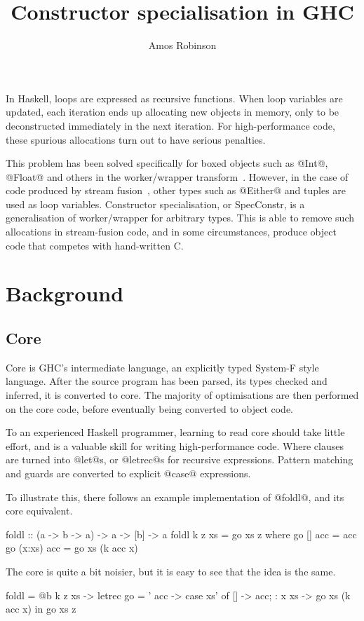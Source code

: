 \documentclass{tmr}
\title{Constructor specialisation in GHC}
\author{Amos Robinson\email{amosr@cse.unsw.edu.au}}
\begin{document}
\makeatactive

\begin{introduction}
In Haskell, loops are expressed as recursive functions. 
When loop variables are updated, each iteration ends up allocating new objects in memory, only to be deconstructed immediately in the next iteration.
For high-performance code, these spurious allocations turn out to have serious penalties.

This problem has been solved specifically for boxed objects such as @Int@, @Float@ and others in the worker/wrapper transform~\CITE.
However, in the case of code produced by stream fusion~\CITE, other types such as @Either@ and tuples are used as loop variables.
Constructor specialisation, or SpecConstr, is a generalisation of worker/wrapper for arbitrary types.
This is able to remove such allocations in stream-fusion code, and in some circumstances, produce object code that competes with hand-written C.
\end{introduction}

\section{Background}
\subsection{Core}
Core is GHC's intermediate language, an explicitly typed System-F style language.
After the source program has been parsed, its types checked and inferred, it is converted to core.
The majority of optimisations are then performed on the core code,
before eventually being converted to object code.

To an experienced Haskell programmer, learning to read core should take little effort, and is a valuable skill for writing high-performance code.
Where clauses are turned into @let@s, or @letrec@s for recursive expressions.
Pattern matching and guards are converted to explicit @case@ expressions.

To illustrate this, there follows an example implementation of @foldl@, and its core equivalent.
\begin{code}
foldl :: (a -> b -> a) -> a -> [b] -> a
foldl k z xs = go xs z
 where
  go []     acc = acc
  go (x:xs) acc = go xs (k acc x)
\end{code}

The core is quite a bit noisier,
but it is easy to see that the idea is the same.

\begin{code}
foldl = \@a @b k z xs ->
 letrec {
     go = \xs' acc ->
       case xs' of {
         []     -> acc;
         : x xs -> go xs (k acc x)
       }
 } in go xs z
\end{code}
\end{document}
